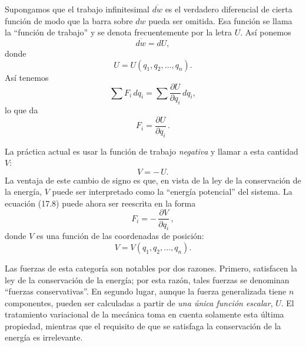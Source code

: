 \documentclass[12pt,a4paper]{book}
\begin{document}
\begin{center}
Supongamos que el trabajo infinitesimal $\overline{dw}$ es el verdadero diferencial de cierta funci\'on de modo que la barra sobre $dw$ pueda ser omitida. Esa funci\'on se llama la ``funci\'on de trabajo'' y se denota frecuentemente por la letra $U$. As\'i ponemos
\begin{equation}
\overline{dw} = dU,
\tag{17.5}
\end{equation}
donde
\begin{equation}
U = U(q_1, q_2, \ldots, q_n).
\tag{17.6}
\end{equation}
As\'i tenemos
\begin{equation}
\sum F_i\,dq_i = \sum \frac{\partial U}{\partial q_i}\,dq_i,
\tag{17.7}
\end{equation}
lo que da
\begin{equation}
F_i = \frac{\partial U}{\partial q_i}\,.
\tag{17.8}
\end{equation}

La pr\'actica actual es usar la funci\'on de trabajo \textit{negativa} y llamar a esta cantidad $V$:
\begin{equation}
V = -\,U.
\tag{17.9}
\end{equation}
La ventaja de este cambio de signo es que, en vista de la ley de la conservaci\'on de la energ\'ia, $V$ puede ser interpretado como la ``energ\'ia potencial'' del sistema. La ecuaci\'on (17.8) puede ahora ser reescrita en la forma
\begin{equation}
F_i = -\,\frac{\partial V}{\partial q_i}\,,
\tag{17.10}
\end{equation}
donde $V$ es una funci\'on de las coordenadas de posici\'on:
\begin{equation}
V = V(q_1, q_2, \ldots, q_n).
\tag{17.11}
\end{equation}

Las fuerzas de esta categor\'ia son notables por dos razones. Primero, satisfacen la ley de la conservaci\'on de la energ\'ia; por esta raz\'on, tales fuerzas se denominan ``fuerzas conservativas''. En segundo lugar, aunque la fuerza generalizada tiene $n$ componentes, pueden ser calculadas a partir de \textit{una \'unica funci\'on escalar}, $U$. El tratamiento variacional de la mec\'anica toma en cuenta solamente esta \'ultima propiedad, mientras que el requisito de que se satisfaga la conservaci\'on de la energ\'ia es irrelevante.


\end{center}
\end{document}
